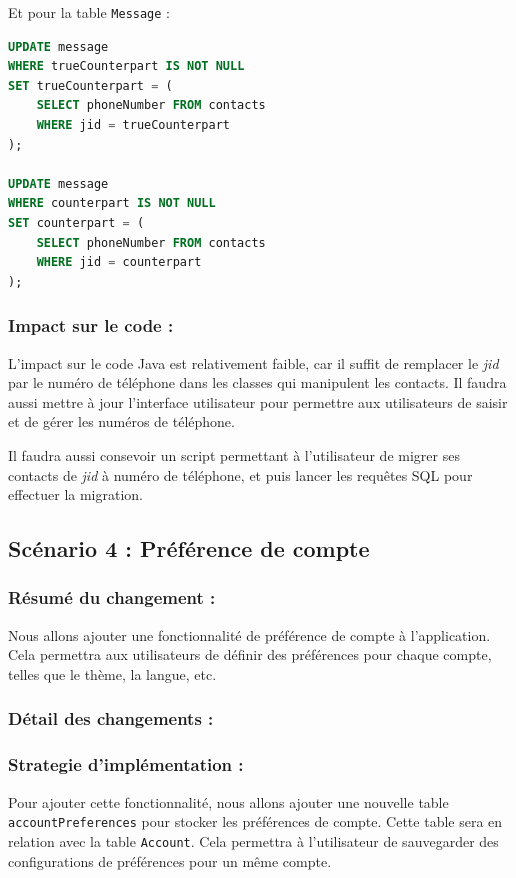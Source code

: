 \documentclass[a4paper,11pt]{article}
\begin{document}
Et pour la table \texttt{Message} :

\begin{lstlisting}[language=SQL]
UPDATE message
WHERE trueCounterpart IS NOT NULL
SET trueCounterpart = (
	SELECT phoneNumber FROM contacts 
	WHERE jid = trueCounterpart
);

UPDATE message
WHERE counterpart IS NOT NULL
SET counterpart = (
	SELECT phoneNumber FROM contacts 
	WHERE jid = counterpart
);
\end{lstlisting}

\subsubsection*{Impact sur le code :}

L'impact sur le code Java est relativement faible, car il suffit de remplacer le \textit{jid} par le numéro de téléphone dans les classes qui manipulent les contacts. Il faudra aussi mettre à jour l'interface utilisateur pour permettre aux utilisateurs de saisir et de gérer les numéros de téléphone.

Il faudra aussi consevoir un script permettant à l'utilisateur de migrer ses contacts de \textit{jid} à numéro de téléphone, et puis lancer les requêtes SQL pour effectuer la migration.

\subsection*{Scénario 4 : Préférence de compte}

\subsubsection*{Résumé du changement :}

Nous allons ajouter une fonctionnalité de préférence de compte à l'application. Cela permettra aux utilisateurs de définir des préférences pour chaque compte, telles que le thème, la langue, etc.

\subsubsection*{Détail des changements :}

\subsubsection*{Strategie d'implémentation :}

Pour ajouter cette fonctionnalité, nous allons ajouter une nouvelle table \texttt{accountPreferences} pour stocker les préférences de compte. Cette table sera en relation avec la table \texttt{Account}. Cela permettra à l'utilisateur de sauvegarder des configurations de préférences pour un même compte.
\end{document}
